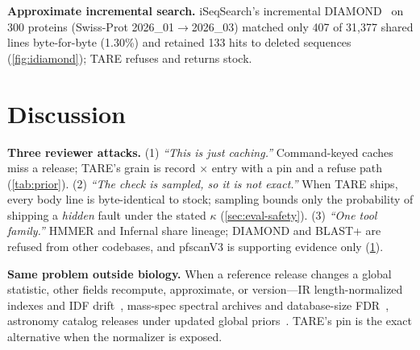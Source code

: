 \documentclass[letterpaper,twocolumn,10pt]{article}
\theoremstyle{definition}
\newcommand{\sys}{TARE\xspace}
\newcommand{\sys}{PARE\xspace}
\begin{document}
\textbf{Approximate incremental search.} iSeqSearch's incremental DIAMOND~\cite{yoo2025iseqsearch} on 300 proteins (Swiss\nobreakdash-Prot 2026\_01$\rightarrow$2026\_03) matched only 407 of 31{,}377 shared lines byte\nobreakdash-for\nobreakdash-byte (1.30\%) and retained 133 hits to deleted sequences (\cref{fig:idiamond}); \sys refuses and returns stock.

\section{Discussion}
\label{sec:discussion}

\textbf{Three reviewer attacks.} (1) \emph{``This is just caching.''} Command\nobreakdash-keyed caches miss a release; \sys's grain is record $\times$ entry with a pin and a refuse path (\cref{tab:prior}).
(2) \emph{``The check is sampled, so it is not exact.''} When \sys ships, every body line is byte\nobreakdash-identical to stock; sampling bounds only the probability of shipping a \emph{hidden} fault under the stated $\kappa$ (\cref{sec:eval-safety}).
(3) \emph{``One tool family.''} HMMER and Infernal share lineage; DIAMOND and BLAST+ are refused from other codebases, and pfscanV3 is supporting evidence only (\cref{sec:discussion}).

\textbf{Same problem outside biology.} When a reference release changes a global statistic, other fields recompute, approximate, or version---IR length\nobreakdash-normalized indexes and IDF drift~\cite{hadjieleftheriou2009incremental,staudinger2024reproducible}, mass\nobreakdash-spec spectral archives and database\nobreakdash-size {FDR}~\cite{frank2011spectral,aggarwal2022fdr}, astronomy catalog releases under updated global priors~\cite{delchambre2023gaia}. \sys's pin is the exact alternative when the normalizer is exposed.
\end{document}
